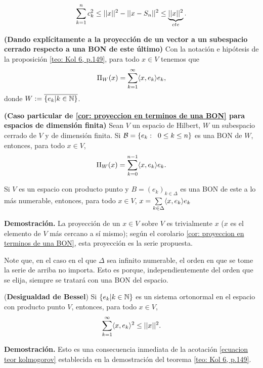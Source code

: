 \begin{equation} \label{ecuacion teor kolmogorov}
\sum\limits_{k=1}^{n}c_{k}^{2} \leq ||x||^{2}-||x-S_{n}||^{2} \leq 
\underbrace{||x||^{2}}_{cte}.
\end{equation}

\QEDB
\vspace{0.2cm}


\begin{cor} \label{cor: proyeccion en terminos de una BON}
\textbf{(Dando explícitamente a la proyección de un vector
a un subespacio cerrado respecto a una BON de este último)}
Con la notación 
e hipótesis
de la proposición \ref{teo: Kol 6, p.149},
para todo $x \in V$
tenemos que
\[
\Pi_{W}(x) = \sum\limits_{k=1}^{\infty} \langle x, e_{k} \rangle e_{k},
\]
donde $W := \overline{\{e_{k}| k \in \mathbb{N} \}}$. 
\end{cor}

\begin{cor}
\label{cor: proyeccion en terminos de BON}
\textbf{(Caso particular de \ref{cor: proyeccion en terminos de una BON} para
espacios de dimensión finita)}
Sean $V$ un espacio de Hilbert, $W$ un subespacio cerrado de $V$
y de dimensión finita. Si 
$\mathcal{B} = \{ e_{k}: \hspace{0.2cm} 0 \leq k \leq n \}$
es una BON de $W$, entonces, para todo $x \in V$,
\[
\Pi_{W}(x) = \sum\limits_{k=0}^{n-1} \langle x, e_{k} \rangle e_{k}.
\]  
\end{cor}


\begin{cor} \label{cor: representacion de un vector respecto a una BON}
Si $V$ es un espacio con producto punto 
y $B=(e_{k})_{k \in \Delta}$ es una BON de este
a lo más numerable, entonces, para todo
$x \in V$, $x = \sum\limits_{k \in \Delta}^{}\langle x, e_{k} \rangle e_{k}$
\end{cor}
\noindent
\textbf{Demostración.}
La proyección de un $x \in V$ sobre $V$ es trivialmente $x$
($x$ es el elemento de $V$ más cercano a sí mismo); según el corolario
\ref{cor: proyeccion en terminos de una BON}, esta
proyección es la serie propuesta. \QEDB
\vspace{0.2cm}

Note que, en el caso en el que $\Delta$ sea infinito numerable,
el orden en que se tome la serie de arriba no importa. Esto es porque,
independientemente del orden que se elija, siempre se tratará con
una BON del espacio. \\

\begin{cor}(\textbf{Desigualdad de Bessel})
Si $\{ e_{k} | k \in \mathbb{N} \}$ es un sistema ortonormal en 
el espacio con producto punto $V$, entonces, para todo $x \in V$,
\[
\sum\limits_{k=1}^{\infty}\langle x , e_{k} \rangle^{2} \leq ||x||^{2}.
\]
\end{cor}
\noindent
\textbf{Demostración.}
Esto es una consecuencia inmediata de la acotación
\eqref{ecuacion teor kolmogorov} establecida en la demostración
del teorema \ref{teo: Kol 6, p.149}.
\QEDB
\vspace{0.2cm}



